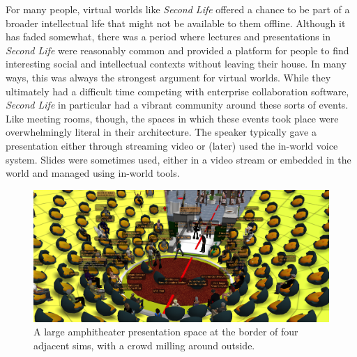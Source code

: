 For many people, virtual worlds like \emph{Second Life} offered a chance to be part of a broader intellectual life that might not be available to them offline. Although it has faded somewhat, there was a period where lectures and presentations in \emph{Second Life} were reasonably common and provided a platform for people to find interesting social and intellectual contexts without leaving their house. In many ways, this was always the strongest argument for virtual worlds. While they ultimately had a difficult time competing with enterprise collaboration software, \emph{Second Life} in particular had a vibrant community around these sorts of events. Like meeting rooms, though, the spaces in which these events took place were overwhelmingly literal in their architecture.  The speaker typically gave a presentation either through streaming video or (later) used the in-world voice system. Slides were sometimes used, either in a video stream or embedded in the world and managed using in-world tools.

\begin{figure}[t]
	\includegraphics{figures/presentation_1.png}
	\caption{A large amphitheater presentation space at the border of four adjacent sims, with a crowd milling around outside.}
	\label{fig:amphitheater_presentation}
\end{figure}


